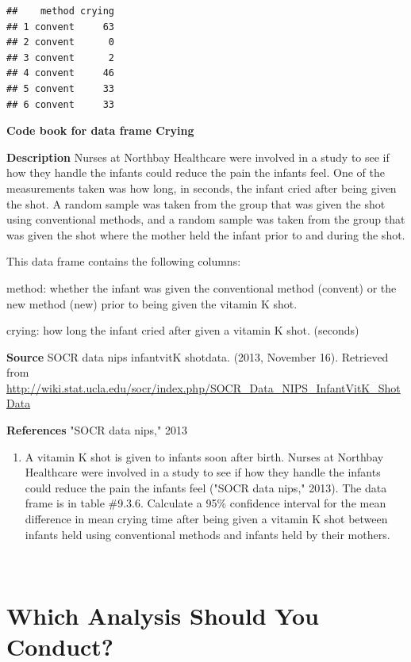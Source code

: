 \documentclass[]{book}
\providecommand{\tightlist}{%
  \setlength{\itemsep}{0pt}\setlength{\parskip}{0pt}}
\begin{document}
\begin{verbatim}
##    method crying
## 1 convent     63
## 2 convent      0
## 3 convent      2
## 4 convent     46
## 5 convent     33
## 6 convent     33
\end{verbatim}

\textbf{Code book for data frame Crying}

\textbf{Description}
Nurses at Northbay Healthcare were involved in a study to see if how they handle the infants could reduce the pain the infants feel. One of the measurements taken was how long, in seconds, the infant cried after being given the shot. A random sample was taken from the group that was given the shot using conventional methods, and a random sample was taken from the group that was given the shot where the mother held the infant prior to and during the shot.

This data frame contains the following columns:

method: whether the infant was given the conventional method (convent) or the new method (new) prior to being given the vitamin K shot.

crying: how long the infant cried after given a vitamin K shot. (seconds)

\textbf{Source}
SOCR data nips infantvitK shotdata. (2013, November 16). Retrieved from
\url{http://wiki.stat.ucla.edu/socr/index.php/SOCR_Data_NIPS_InfantVitK_ShotData}

\textbf{References}
"SOCR data nips," 2013

\begin{enumerate}
\def\labelenumi{\arabic{enumi}.}
\setcounter{enumi}{7}
\tightlist
\item
  A vitamin K shot is given to infants soon after birth. Nurses at Northbay Healthcare were involved in a study to see if how they handle the infants could reduce the pain the infants feel ("SOCR data nips," 2013). The data frame is in table \#9.3.6. Calculate a 95\% confidence interval for the mean difference in mean crying time after being given a vitamin K shot between infants held using conventional methods and infants held by their mothers.
\end{enumerate}

\textbf{\\
}

\hypertarget{which-analysis-should-you-conduct}{%
\section{Which Analysis Should You Conduct?}\label{which-analysis-should-you-conduct}}
\end{document}
